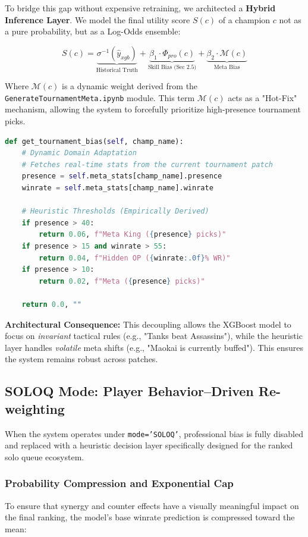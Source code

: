 \documentclass[12pt, a4paper]{article}
\begin{document}
    To bridge this gap without expensive retraining, we architected a \textbf{Hybrid Inference Layer}. We model the final utility score $S(c)$ of a champion $c$ not as a pure probability, but as a Log-Odds ensemble:

    \begin{equation}
        S(c) = \underbrace{\sigma^{-1}(\hat{y}_{xgb})}_{\text{Historical Truth}} + \underbrace{\beta_1 \cdot \Phi_{pro}(c)}_{\text{Skill Bias (Sec 2.5)}} + \underbrace{\beta_2 \cdot \mathcal{M}(c)}_{\text{Meta Bias}}
    \end{equation}

    Where $\mathcal{M}(c)$ is a dynamic weight derived from the \texttt{GenerateTournamentMeta.ipynb} module. This term $\mathcal{M}(c)$ acts as a "Hot-Fix" mechanism, allowing the system to forcefully prioritize high-presence tournament picks.

    \begin{lstlisting}[language=Python, caption={Heuristic Bias Injection Logic}]
def get_tournament_bias(self, champ_name):
    # Dynamic Domain Adaptation
    # Fetches real-time stats from the current tournament patch
    presence = self.meta_stats[champ_name].presence
    winrate = self.meta_stats[champ_name].winrate

    # Heuristic Thresholds (Empirically Derived)
    if presence > 40:
        return 0.06, f"Meta King ({presence} picks)"
    if presence > 15 and winrate > 55:
        return 0.04, f"Hidden OP ({winrate:.0f}% WR)"
    if presence > 10:
        return 0.02, f"Meta ({presence} picks)"

    return 0.0, ""
    \end{lstlisting}

    \textbf{Architectural Consequence:} This decoupling allows the XGBoost model to focus on \textit{invariant} tactical rules (e.g., "Tanks beat Assassins"), while the heuristic layer handles \textit{volatile} meta shifts (e.g., "Maokai is currently buffed"). This ensures the system remains robust across patches.

    \subsection{SOLOQ Mode: Player Behavior–Driven Re-weighting}
    When the system operates under \texttt{mode='SOLOQ'}, professional bias is fully disabled and replaced with a heuristic decision layer specifically designed for the ranked solo queue ecosystem.

    \subsubsection{Probability Compression and Exponential Cap}
    To ensure that synergy and counter effects have a visually meaningful impact on the final ranking, the model’s base winrate prediction is compressed toward the mean:
\end{document}
